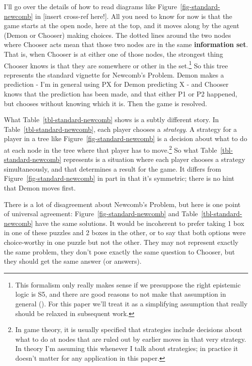 \documentclass[
  10pt,
  letterpaper,
  DIV=11,
  numbers=noendperiod,
  twoside]{scrartcl}
\begin{document}
I'll go over the details of how to read diagrams like
Figure~\ref{fig-standard-newcomb} in {[}insert cross-ref here!{]}. All
you need to know for now is that the game starts at the open node, here
at the top, and it moves along by the agent (Demon or Chooser) making
choices. The dotted lines around the two nodes where Chooser acts mean
that those two nodes are in the same \textbf{information set}. That is,
when Chooser is at either one of those nodes, the strongest thing
Chooser knows is that they are somewhere or other in the set.\footnote{This
  formalism only really makes sense if we presuppose the right epistemic
  logic is S5, and there are good reasons to not make that assumption in
  general ().
  For this paper we'll treat it as a simplifying assumption that really
  should be relaxed in subsequent work.} So this tree represents the
standard vignette for Newcomb's Problem. Demon makes a prediction - I'm
in general using PX for Demon predicting X - and Chooser knows that the
prediction has been made, and that either P1 or P2 happened, but chooses
without knowing which it is. Then the game is resolved.

What Table~\ref{tbl-standard-newcomb} shows is a subtly different story.
In Table~\ref{tbl-standard-newcomb}, each player chooses a
\emph{strategy}. A strategy for a player in a tree like
Figure~\ref{fig-standard-newcomb} is a decision about what to do at each
node in the tree where that player has to move.\footnote{In game theory,
  it is usually specified that strategies include decisions about what
  to do at nodes that are ruled out by earlier moves in that very
  strategy. In theory I'm assuming this whenever I talk about
  strategies; in practice it doesn't matter for any application in this
  paper.} So what Table~\ref{tbl-standard-newcomb} represents is a
situation where each player chooses a strategy simultaneously, and that
determines a result for the game. It differs from
Figure~\ref{fig-standard-newcomb} in part in that it's symmetric; there
is no hint that Demon moves first.

There is a lot of disagreement about Newcomb's Problem, but here is one
point of universal agreement: Figure~\ref{fig-standard-newcomb} and
Table~\ref{tbl-standard-newcomb} have the same solutions. It would be
incoherent to prefer taking 1 box in one of these puzzles and 2 boxes in
the other, or to say that both options were choice-worthy in one puzzle
but not the other. They may not represent exactly the same problem, they
don't pose exactly the same question to Chooser, but they should get the
same answer (or answers).
\end{document}
